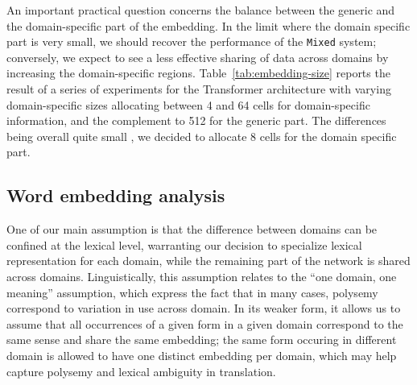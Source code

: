 \documentclass[11pt,a4paper]{article}
\newcommand{\fyTodo}[1]{\Todo[FY:]{\textcolor{orange}{#1}}}
\begin{document}
An important practical question concerns the balance between the generic and the domain-specific part of the embedding. In the limit where the domain specific part is very small, we should recover the performance of the \texttt{Mixed} system; conversely, we expect to see a less effective sharing of data across domains by increasing the domain-specific regions. Table~\ref{tab:embedding-size} reports the result of  a series of experiments for the Transformer\fyTodo{Check This} architecture with varying domain-specific sizes allocating between 4 and 64 cells for domain-specific information, and the complement to 512 for the generic part. The differences being overall quite small \fyTodo{Comments - is this due to prior ?}, we decided to allocate $8$ cells for the domain specific part. \fyTodo{Easily accomodate more domains}
\fyTodo{Given the ways embeddings are computed, why not add more domains, and test robustness agains data presentation order ?}
\begin{table}[!h]
\begin{center}
\end{center}
\caption{BPE-detokenized BLEU scores for the Transformer architecture for varying domain-specific embedding sizes}
\end{table}

\subsection{Word embedding analysis \label{ssec:word_embeddings}}
One of our main assumption is that the difference between domains can be confined at the lexical level, warranting our decision to specialize lexical representation for each domain, while the remaining part of the network is shared across domains. Linguistically, this assumption relates to the ``one domain, one meaning'' assumption, which express the fact that in many cases, polysemy correspond to variation in use across domain. In its weaker form, it allows us to assume that all occurrences of a given form in a given domain correspond to the same sense and share the same embedding; the same form occuring in different domain is allowed to have one distinct embedding per domain, which may help capture polysemy and lexical ambiguity in translation. 
\end{document}
